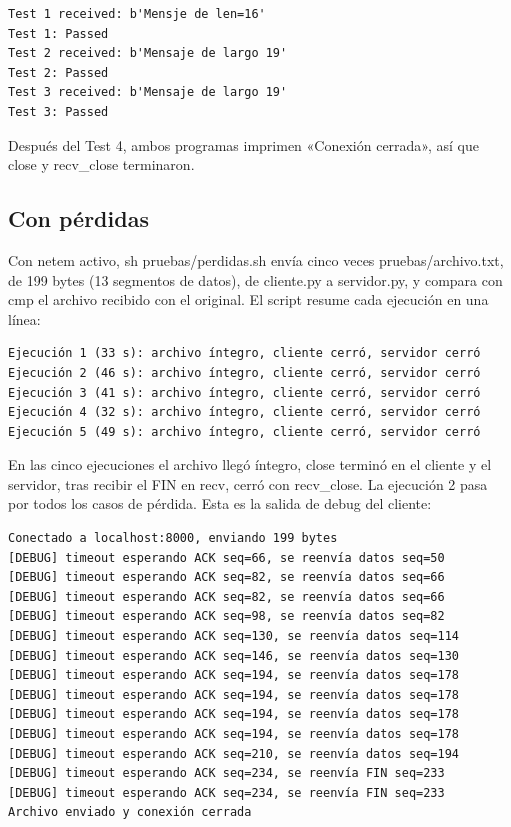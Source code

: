 \documentclass[
	spanish, %
	letterpaper, oneside
]{article}
\newcommand{\code}[1]{#1}     %
\newcommand{\flag}[1]{#1}     %
\begin{document}
{\small
\begin{verbatim}
Test 1 received: b'Mensje de len=16'
Test 1: Passed
Test 2 received: b'Mensaje de largo 19'
Test 2: Passed
Test 3 received: b'Mensaje de largo 19'
Test 3: Passed
\end{verbatim}}

Después del Test 4, ambos programas imprimen «Conexión cerrada», así que \code{close} y
\code{recv\_close} terminaron.

\subsection{Con pérdidas}
\label{sec:pruebas-perdidas}
Con netem activo, \code{sh pruebas/perdidas.sh} envía cinco veces \code{pruebas/archivo.txt}, de
199 bytes (13 segmentos de datos), de \code{cliente.py} a \code{servidor.py}, y compara con
\code{cmp} el archivo recibido con el original. El script resume cada ejecución en una línea:

{\small
\begin{verbatim}
Ejecución 1 (33 s): archivo íntegro, cliente cerró, servidor cerró
Ejecución 2 (46 s): archivo íntegro, cliente cerró, servidor cerró
Ejecución 3 (41 s): archivo íntegro, cliente cerró, servidor cerró
Ejecución 4 (32 s): archivo íntegro, cliente cerró, servidor cerró
Ejecución 5 (49 s): archivo íntegro, cliente cerró, servidor cerró
\end{verbatim}}

En las cinco ejecuciones el archivo llegó íntegro, \code{close} terminó en el cliente y el
servidor, tras recibir el \flag{FIN} en \code{recv}, cerró con \code{recv\_close}. La ejecución 2
pasa por todos los casos de pérdida. Esta es la salida de debug del cliente:

{\small
\begin{verbatim}
Conectado a localhost:8000, enviando 199 bytes
[DEBUG] timeout esperando ACK seq=66, se reenvía datos seq=50
[DEBUG] timeout esperando ACK seq=82, se reenvía datos seq=66
[DEBUG] timeout esperando ACK seq=82, se reenvía datos seq=66
[DEBUG] timeout esperando ACK seq=98, se reenvía datos seq=82
[DEBUG] timeout esperando ACK seq=130, se reenvía datos seq=114
[DEBUG] timeout esperando ACK seq=146, se reenvía datos seq=130
[DEBUG] timeout esperando ACK seq=194, se reenvía datos seq=178
[DEBUG] timeout esperando ACK seq=194, se reenvía datos seq=178
[DEBUG] timeout esperando ACK seq=194, se reenvía datos seq=178
[DEBUG] timeout esperando ACK seq=194, se reenvía datos seq=178
[DEBUG] timeout esperando ACK seq=210, se reenvía datos seq=194
[DEBUG] timeout esperando ACK seq=234, se reenvía FIN seq=233
[DEBUG] timeout esperando ACK seq=234, se reenvía FIN seq=233
Archivo enviado y conexión cerrada
\end{verbatim}}
\end{document}
